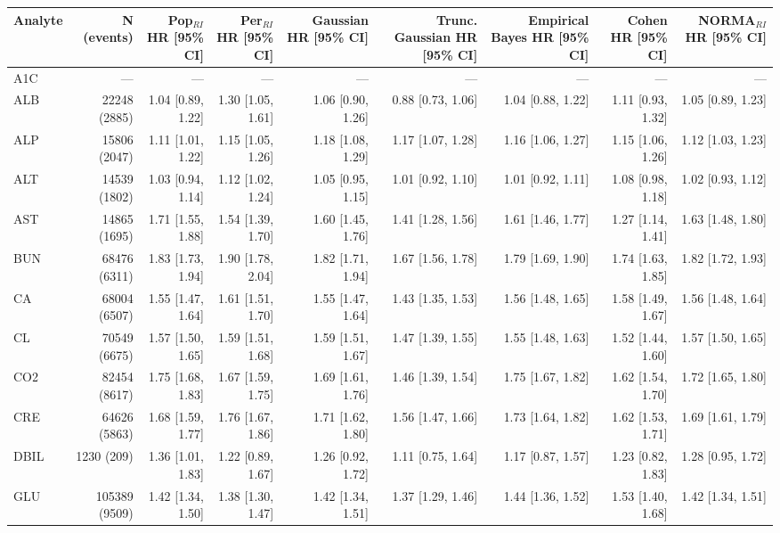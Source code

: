 \begin{table}[ht]
\centering
\footnotesize
\begin{tabular}{lrrrrrrrr}
\toprule
Analyte & N (events) & Pop$_{RI}$ HR [95\% CI] & Per$_{RI}$ HR [95\% CI] & Gaussian HR [95\% CI] & Trunc. Gaussian HR [95\% CI] & Empirical Bayes HR [95\% CI] & Cohen HR [95\% CI] & NORMA$_{RI}$ HR [95\% CI] \\
\midrule
A1C & --- & --- & --- & --- & --- & --- & --- & --- \\
ALB & 22248 (2885) & 1.04 [0.89, 1.22] & 1.30 [1.05, 1.61] & 1.06 [0.90, 1.26] & 0.88 [0.73, 1.06] & 1.04 [0.88, 1.22] & 1.11 [0.93, 1.32] & 1.05 [0.89, 1.23] \\
ALP & 15806 (2047) & 1.11 [1.01, 1.22] & 1.15 [1.05, 1.26] & 1.18 [1.08, 1.29] & 1.17 [1.07, 1.28] & 1.16 [1.06, 1.27] & 1.15 [1.06, 1.26] & 1.12 [1.03, 1.23] \\
ALT & 14539 (1802) & 1.03 [0.94, 1.14] & 1.12 [1.02, 1.24] & 1.05 [0.95, 1.15] & 1.01 [0.92, 1.10] & 1.01 [0.92, 1.11] & 1.08 [0.98, 1.18] & 1.02 [0.93, 1.12] \\
AST & 14865 (1695) & 1.71 [1.55, 1.88] & 1.54 [1.39, 1.70] & 1.60 [1.45, 1.76] & 1.41 [1.28, 1.56] & 1.61 [1.46, 1.77] & 1.27 [1.14, 1.41] & 1.63 [1.48, 1.80] \\
BUN & 68476 (6311) & 1.83 [1.73, 1.94] & 1.90 [1.78, 2.04] & 1.82 [1.71, 1.94] & 1.67 [1.56, 1.78] & 1.79 [1.69, 1.90] & 1.74 [1.63, 1.85] & 1.82 [1.72, 1.93] \\
CA & 68004 (6507) & 1.55 [1.47, 1.64] & 1.61 [1.51, 1.70] & 1.55 [1.47, 1.64] & 1.43 [1.35, 1.53] & 1.56 [1.48, 1.65] & 1.58 [1.49, 1.67] & 1.56 [1.48, 1.64] \\
CL & 70549 (6675) & 1.57 [1.50, 1.65] & 1.59 [1.51, 1.68] & 1.59 [1.51, 1.67] & 1.47 [1.39, 1.55] & 1.55 [1.48, 1.63] & 1.52 [1.44, 1.60] & 1.57 [1.50, 1.65] \\
CO2 & 82454 (8617) & 1.75 [1.68, 1.83] & 1.67 [1.59, 1.75] & 1.69 [1.61, 1.76] & 1.46 [1.39, 1.54] & 1.75 [1.67, 1.82] & 1.62 [1.54, 1.70] & 1.72 [1.65, 1.80] \\
CRE & 64626 (5863) & 1.68 [1.59, 1.77] & 1.76 [1.67, 1.86] & 1.71 [1.62, 1.80] & 1.56 [1.47, 1.66] & 1.73 [1.64, 1.82] & 1.62 [1.53, 1.71] & 1.69 [1.61, 1.79] \\
DBIL & 1230 (209) & 1.36 [1.01, 1.83] & 1.22 [0.89, 1.67] & 1.26 [0.92, 1.72] & 1.11 [0.75, 1.64] & 1.17 [0.87, 1.57] & 1.23 [0.82, 1.83] & 1.28 [0.95, 1.72] \\
GLU & 105389 (9509) & 1.42 [1.34, 1.50] & 1.38 [1.30, 1.47] & 1.42 [1.34, 1.51] & 1.37 [1.29, 1.46] & 1.44 [1.36, 1.52] & 1.53 [1.40, 1.68] & 1.42 [1.34, 1.51] \\

\end{tabular}
\end{table}
